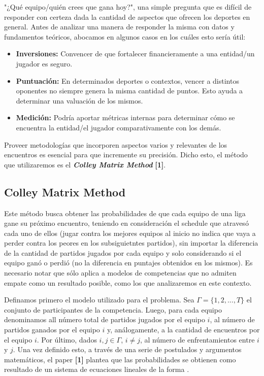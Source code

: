 "¿Qu\'e equipo/qui\'en crees que gana hoy?", una simple pregunta que es dif\'icil de responder con certeza dada la cantidad de aspectos que ofrecen los deportes en general. Antes de analizar una manera de responder la misma con datos y fundamentos te\'oricos, abocamos en algunos casos en los cuáles esto ser\'ia \'util:

\begin{itemize}
\item \textbf{Inversiones:} Convencer de que fortalecer financieramente a una entidad/un jugador es seguro.
\item \textbf{Puntuaci\'on:} En determinados deportes o contextos, vencer a distintos oponentes no siempre genera la misma cantidad de puntos. Esto ayuda a determinar una valuaci\'on de los mismos.
\item \textbf{Medici\'on:} Podr\'ia aportar m\'etricas internas para determinar c\'omo se encuentra la entidad/el jugador comparativamente con los dem\'as.
\end{itemize}

Proveer metodolog\'ias que incorporen aspectos varios y relevantes de los encuentros es esencial para que incremente su precisión. Dicho esto, el m\'etodo que utilizaremos es el \textbf{\textit{Colley Matrix Method}} \textbf{[1]}.

\subsection{Colley Matrix Method}

Este m\'etodo busca obtener las probabilidades de que cada equipo de una liga gane su pr\'oximo encuentro, teniendo en consideraci\'on el schedule que atraves\'o cada uno de ellos (jugar contra los mejores equipos al inicio no indica que vaya a perder contra los peores en los subsiguietntes partidos), sin importar la diferencia de la cantidad de partidos jugados por cada equipo y solo considerando si el equipo gan\'o o perdi\'o (no la diferencia en puntajes obtenidos en los mismos). Es necesario notar que s\'olo aplica a modelos de competencias que no admiten empate como un resultado posible, como los que analizaremos en este contexto.

Definamos primero el modelo utilizado para el problema. Sea $\Gamma = \{1,2,...,T\}$ el conjunto de participantes de la competencia. Luego, para cada equipo  denominamos  all n\'umero total de partidos jugados por el equipo $i$,  al n\'umero de partidos ganados por el equipo $i$ y, an\'alogamente,  a la cantidad de encuentros por el equipo $i$. Por \'ultimo, dados $i, j \in \Gamma$, $i \neq j$,  al n\'umero de enfrentamientos entre $i$ y $j$. Una vez definido esto, a través de una serie de postulados y argumentos matemáticos, el paper \textbf{[1]} plantea que las probabilidades se obtienen como resultado de un sistema de ecuaciones lineales de la forma . \\

